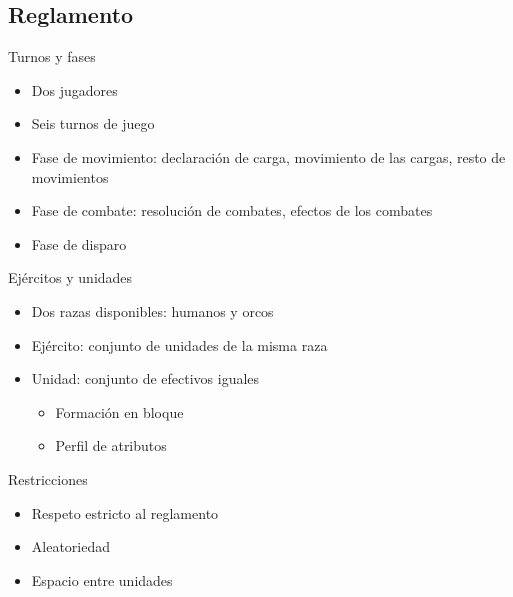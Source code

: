 \documentclass[green, compress]{beamer}
\begin{document}
\subsection{Reglamento}
\begin{frame}
  \begin{block}{Turnos y fases}
    \begin{itemize}
    \item Dos jugadores
    \item Seis turnos de juego
    \item Fase de movimiento: declaración de carga, movimiento de las
      cargas, resto de movimientos
    \item Fase de combate: resolución de combates, efectos de los combates
    \item Fase de disparo
    \end{itemize}
  \end{block}
\end{frame}

\begin{frame}
  \begin{block}{Ejércitos y unidades}
    \begin{itemize}
    \item Dos razas disponibles: humanos y orcos
    \item Ejército: conjunto de unidades de la misma raza
    \item Unidad: conjunto de efectivos iguales
      \begin{itemize}
      \item Formación en bloque
      \item Perfil de atributos
      \end{itemize}
    \end{itemize}
  \end{block}

  \begin{block}{Restricciones}
    \begin{itemize}
    \item Respeto estricto al reglamento
    \item Aleatoriedad
    \item Espacio entre unidades
    \end{itemize}
  \end{block}
\end{frame}
\end{document}
